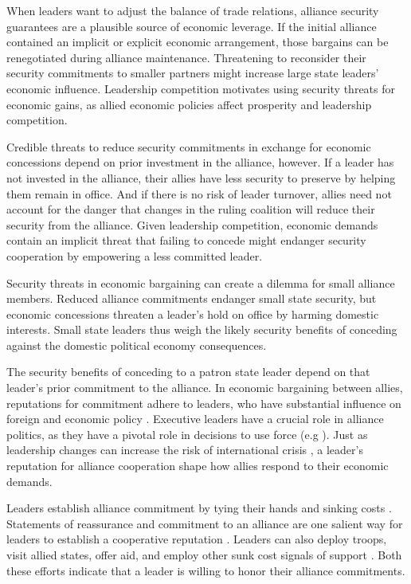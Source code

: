 \documentclass[12pt]{article}
\begin{document}
When leaders want to adjust the balance of trade relations, alliance security guarantees are a plausible source of economic leverage. 
If the initial alliance contained an implicit or explicit economic arrangement, those bargains can be renegotiated during alliance maintenance. 
Threatening to reconsider their security commitments to smaller partners might increase large state leaders' economic influence. 
Leadership competition motivates using security threats for economic gains, as allied economic policies affect prosperity and leadership competition. 


Credible threats to reduce security commitments in exchange for economic concessions depend on prior investment in the alliance, however. 
If a leader has not invested in the alliance, their allies have less security to preserve by helping them remain in office. 
And if there is no risk of leader turnover, allies need not account for the danger that changes in the ruling coalition will reduce their security from the alliance. 
Given leadership competition, economic demands contain an implicit threat that failing to concede might endanger security cooperation by empowering a less committed leader.


Security threats in economic bargaining can create a dilemma for small alliance members. 
Reduced alliance commitments endanger small state security, but economic concessions threaten a leader's hold on office by harming domestic interests. 
Small state leaders thus weigh the likely security benefits of conceding against the domestic political economy consequences.


The security benefits of conceding to a patron state leader depend on that leader's prior commitment to the alliance. 
In economic bargaining between allies, reputations for commitment adhere to leaders, who have substantial influence on foreign and economic policy \citep{Renshonetal2018}.
Executive leaders have a crucial role in alliance politics, as they have a pivotal role in decisions to use force (e.g \citep{Colgan2013, ColganWeeks2015}).
Just as leadership changes can increase the risk of international crisis \citep{Wolford2007}, a leader's reputation for alliance cooperation shape how allies respond to their economic demands. 


Leaders establish alliance commitment by tying their hands and sinking costs \citep{Fearon1997}. 
Statements of reassurance and commitment to an alliance are one salient way for leaders to establish a cooperative reputation \citep{Blankenship2020}.
Leaders can also deploy troops, visit allied states, offer aid, and employ other sunk cost signals of support \citep{McManusNieman2019}.
Both these efforts indicate that a leader is willing to honor their alliance commitments. 
\end{document}
